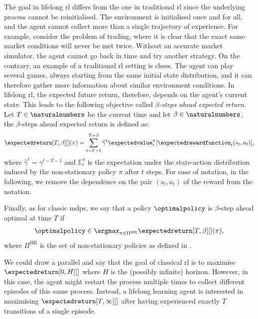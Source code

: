 The goal in lifelong \gls{rl} differs from the one in traditional \gls{rl} since the underlying process cannot be reinitialised.
The environment is initialised once and for all, and the agent cannot collect more than a single trajectory of experience. 
For example, consider the problem of trading, where it is clear that the exact same market conditions will never be met twice. 
Without an accurate market simulator, the agent cannot go back in time and try another strategy. 
On the contrary, an example of a traditional \gls{rl} setting is chess. 
The agent can play several games, always starting from the same initial state distribution, and it can therefore gather more information about similar environment conditions. 
In lifelong \gls{rl}, the expected future return, therefore, depends on the agent's current state. 
This leads to the following objective called \emph{$\beta$-steps ahead expected return}.
Let $T \in \naturalnumbers$ be the current time and let $\beta \in \naturalnumbers$, the {$\beta$-steps ahead expected return} is defined as:
\begin{align}\label{eq:beta_steps_ahead_return}
	\expectedreturn[T,\beta][](\pi) =\sum_{t = T+1}^{T+\beta} \widehat{\gamma}^t \expectedvalue_t^\pi [\expectedrewardfunction_{t}(s_t,a_t)],
\end{align}
where $\widehat{\gamma}^t = \gamma^{t-T-1}$ and $\mathbb{E}_t^\pi$ is the expectation under the state-action distribution induced by the non-stationary policy $\pi$ after $t$ steps.
For ease of notation, in the following, we remove the dependence on the pair $(s_t,a_t)$ of the reward from the notation. 

Finally, as for classic \glspl{mdp}, we say that a policy $\optimalpolicy$ is $\beta$-step ahead optimal at time $T$ if 
\begin{align*}
    \optimalpolicy\in \argmax_{\pi \in \Pi^{\text{HR}}} \expectedreturn[T,\beta][](\pi),
\end{align*}
where $\Pi^{\text{HR}}$ is the set of non-stationary policies as defined in .

We could draw a parallel and say that the goal of classical \gls{rl} is to maximise $\expectedreturn[0,H][]$ where $H$ is the (possibly infinite) horizon. 
However, in this case, the agent might restart the process multiple times to collect different episodes of this same process.
Instead, a lifelong learning agent is interested in maximising 
$\expectedreturn[T,\infty][]$ after having experienced exactly $T$ transitions of a single episode. 


